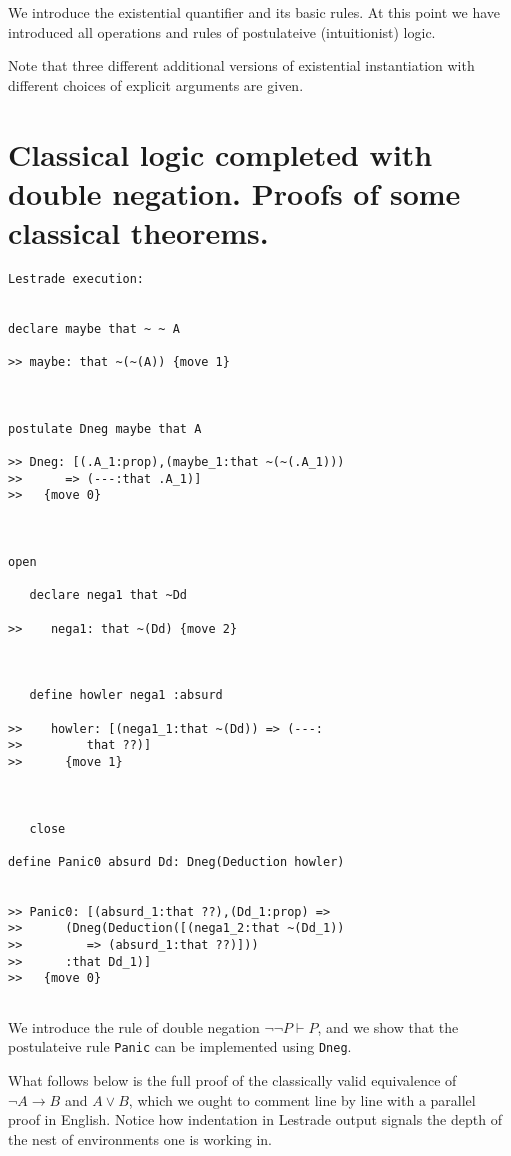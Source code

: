 \documentclass[12pt]{article}
\begin{document}
We introduce the existential quantifier and its basic rules.  At this point we have introduced all operations and rules of postulateive (intuitionist) logic.

Note that three different additional versions of existential instantiation with different choices of explicit arguments are given.

\section{Classical logic completed with double negation.  Proofs of some classical theorems.}

\begin{verbatim}Lestrade execution:


declare maybe that ~ ~ A

>> maybe: that ~(~(A)) {move 1}



postulate Dneg maybe that A

>> Dneg: [(.A_1:prop),(maybe_1:that ~(~(.A_1)))
>>      => (---:that .A_1)]
>>   {move 0}



open

   declare nega1 that ~Dd

>>    nega1: that ~(Dd) {move 2}



   define howler nega1 :absurd

>>    howler: [(nega1_1:that ~(Dd)) => (---:
>>         that ??)]
>>      {move 1}



   close

define Panic0 absurd Dd: Dneg(Deduction howler)


>> Panic0: [(absurd_1:that ??),(Dd_1:prop) =>
>>      (Dneg(Deduction([(nega1_2:that ~(Dd_1))
>>         => (absurd_1:that ??)]))
>>      :that Dd_1)]
>>   {move 0}


\end{verbatim}

We introduce the rule of double negation $\neg \neg P \vdash P$, and we show that the postulateive rule {\tt Panic} can be implemented using
{\tt Dneg}.

What follows below is the full proof of the classically valid equivalence of $\neg A \rightarrow B$ and $A \vee B$, which we ought to comment
line by line with a parallel proof in English.  Notice how indentation in Lestrade output signals the depth of the nest of environments one is working in.
\end{document}
